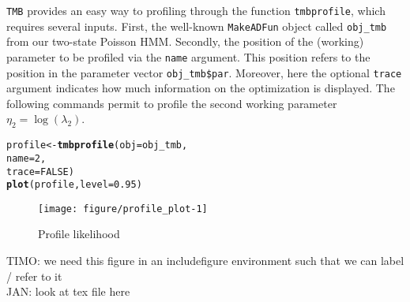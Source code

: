 \documentclass[bimj,fleqn]{w-art}\usepackage[]{graphicx}\usepackage[]{color}
\makeatletter
\def\maxwidth{ %
  \ifdim\Gin@nat@width>\linewidth
    \linewidth
  \else
    \Gin@nat@width
  \fi
}
\newcommand{\hlnum}[1]{\textcolor[rgb]{0.686,0.059,0.569}{#1}}%
\newcommand{\hlstd}[1]{\textcolor[rgb]{0.345,0.345,0.345}{#1}}%
\newcommand{\hlkwb}[1]{\textcolor[rgb]{0.69,0.353,0.396}{#1}}%
\newcommand{\hlkwc}[1]{\textcolor[rgb]{0.333,0.667,0.333}{#1}}%
\newcommand{\hlkwd}[1]{\textcolor[rgb]{0.737,0.353,0.396}{\textbf{#1}}}%
\newenvironment{kframe}{%
 \def\at@end@of@kframe{}%
 \ifinner\ifhmode%
  \def\at@end@of@kframe{\end{minipage}}%
  \begin{minipage}{\columnwidth}%
 \fi\fi%
 \def\FrameCommand##1{\hskip\@totalleftmargin \hskip-\fboxsep
 \colorbox{shadecolor}{##1}\hskip-\fboxsep
     \hskip-\linewidth \hskip-\@totalleftmargin \hskip\columnwidth}%
 \MakeFramed {\advance\hsize-\width
   \@totalleftmargin\z@ \linewidth\hsize
   \@setminipage}}%
 {\par\unskip\endMakeFramed%
 \at@end@of@kframe}
\newenvironment{knitrout}{}{} %
\theoremstyle{plain}
\theoremstyle{definition}
\makeatother
\begin{document}
{\tt{TMB}} provides an easy way to profiling through the function {\tt{tmbprofile}}, which requires several inputs. First, the well-known \texttt{MakeADFun} object called \texttt{obj\_tmb} from our two-state Poisson HMM. Secondly, the position of the (working) parameter to be profiled via the \texttt{name} argument. This position refers to the position in the parameter vector \texttt{obj\_tmb\$par}. Moreover, here the optional \texttt{trace} argument indicates how much information on the optimization is displayed. The following commands permit to profile the second working parameter $\eta_2 = \log(\lambda_2)$. 
\begin{knitrout}
\color{fgcolor}\begin{kframe}
\begin{alltt}
\hlstd{profile} \hlkwb{<-} \hlkwd{tmbprofile}\hlstd{(}\hlkwc{obj} \hlstd{= obj_tmb,}
                      \hlkwc{name} \hlstd{=} \hlnum{2}\hlstd{,}
                      \hlkwc{trace} \hlstd{=} \hlnum{FALSE}\hlstd{)}
\hlkwd{plot}\hlstd{(profile,} \hlkwc{level} \hlstd{=} \hlnum{0.95}\hlstd{)}
\end{alltt}
\end{kframe}\begin{figure}[htb]

{\centering \texttt{[image: figure/profile\_plot-1]} 

}

\caption[Profile likelihood]{Profile likelihood}\label{fig:profile_plot}
\end{figure}


\end{knitrout}
TIMO: we need this figure in an includefigure environment such that we can label / refer to it\\
JAN: look at tex file here
\end{document}
